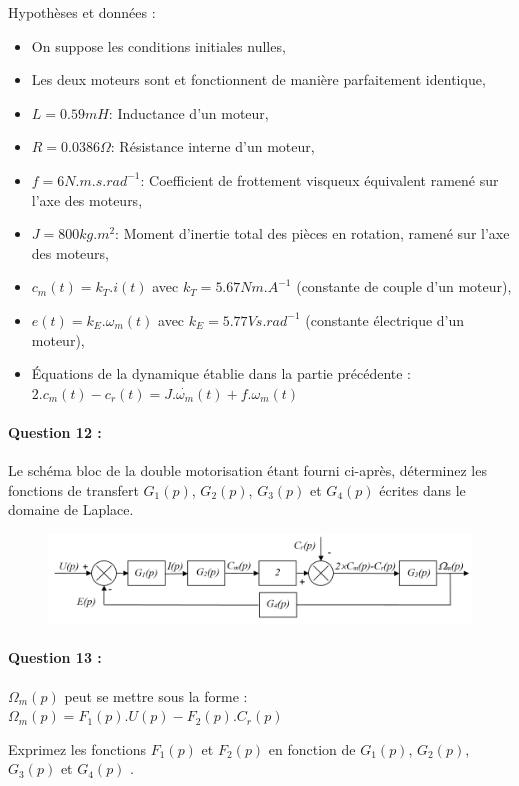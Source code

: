 Hypothèses et données :
\begin{itemize}
 \item On suppose les conditions initiales nulles,
 \item Les deux moteurs sont et fonctionnent de manière parfaitement identique,
 \item $L=0.59 mH$: Inductance d'un moteur,
 \item $R=0.0386\Omega$: Résistance interne d'un moteur,
 \item $f=6 N.m.s.rad^{-1}$: Coefficient de frottement visqueux équivalent ramené sur l'axe des moteurs,
 \item $J=800kg.m^2$: Moment d'inertie total des pièces en rotation, ramené sur l'axe des moteurs,
 \item $c_m(t)=k_T.i(t)$ avec $k_T=5.67Nm.A^{-1}$ (constante de couple d'un moteur),
 \item $e(t)=k_E.\omega_m(t)$ avec $k_E=5.77 Vs.rad^{-1}$ (constante électrique d'un moteur),
 \item Équations de la dynamique établie dans la partie précédente : $2.c_m(t)-c_r(t)=J.\dot{\omega_m}(t)+f.\omega_m(t)$
\end{itemize}	 

\paragraph{Question 12 :} Le schéma bloc de la double motorisation étant fourni ci-après, déterminez les fonctions de transfert  $G_1(p)$, $G_2(p)$, $G_3(p)$ et $G_4(p)$ écrites dans le domaine de Laplace.

\begin{figure}[!h]
\centering
\includegraphics[width=0.8\linewidth]{img/fig26}
\label{fig26}
\end{figure}

\paragraph{Question 13 :} $\Omega_m(p)$ peut se mettre sous la forme :  $\Omega_m(p)=F_1(p).U(p)-F_2(p).C_r(p)$

Exprimez les fonctions $F_1(p)$ et $F_2(p)$ en fonction de $G_1(p)$, $G_2(p)$, $G_3(p)$ et $G_4(p)$	.

